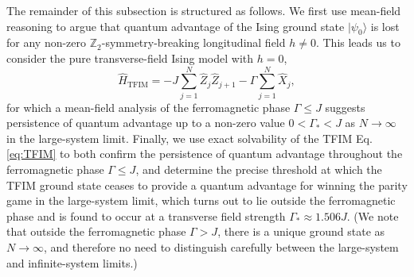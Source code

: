 \documentclass[prb,twocolumn,showpacs,amssymb,superscriptaddress]{revtex4-2}
\begin{document}
The remainder of this subsection is structured as follows. We first use mean-field reasoning to argue that quantum advantage of the Ising ground state  $|\psi_0\rangle$ is lost for any non-zero $\mathbb{Z}_2$-symmetry-breaking longitudinal field $h \neq 0$. This leads us to consider the pure transverse-field Ising model with $h=0$,
\begin{equation}
\label{eq:TFIM}
\hat{H}_{\mathrm{TFIM}} = -J \sum_{j=1}^N \hat{Z}_j \hat{Z}_{j+1} - \Gamma \sum_{j=1}^N \hat{X}_j,
\end{equation}
for which a mean-field analysis of the ferromagnetic phase $\Gamma \leq J$ suggests persistence of quantum advantage up to a non-zero value $0<\Gamma_* < J$ as $N \to \infty$ in the large-system limit. Finally, we use exact solvability of the TFIM Eq. \eqref{eq:TFIM} to both confirm the persistence of quantum advantage throughout the ferromagnetic phase $\Gamma \leq J$, and determine the precise threshold at which the TFIM ground state ceases to provide a quantum advantage for winning the parity game in the large-system limit, which turns out to lie outside the ferromagnetic phase and is found to occur at a transverse field strength $\Gamma_* \approx 1.506 J$. (We note that outside the ferromagnetic phase $\Gamma > J$, there is a unique ground state as $N \to \infty$, and therefore no need to distinguish carefully between the large-system and infinite-system limits.)
\end{document}
